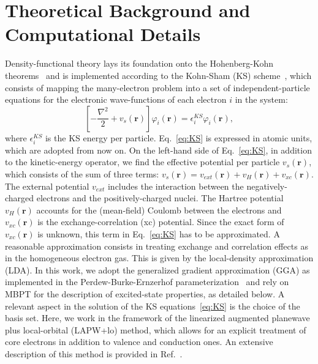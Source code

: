 \documentclass[aps,pra,superscriptaddress,twocolumn]{revtex4}
\begin{document}
\section{Theoretical Background and Computational Details}
\label{section:theory}

Density-functional theory lays its foundation onto the Hohenberg-Kohn theorems~\cite{hohe-kohn64pr} and is implemented according to the Kohn-Sham (KS) scheme~\cite{kohn-sham65pr}, which consists of mapping the many-electron problem into a set of independent-particle equations for the electronic wave-functions of each electron $i$ in the system:
%
\begin{equation}
\left[-\dfrac{\nabla^2}{2} + v_s(\mathbf{r}) \right] \varphi_i(\mathbf{r}) = \epsilon^{KS}_i \varphi_i(\mathbf{r}),
\label{eq:KS}
\end{equation}
%
where $\epsilon^{KS}_i$ is the KS energy per particle.
Eq.~\eqref{eq:KS} is expressed in atomic units, which are adopted from now on.
On the left-hand side of Eq.~\eqref{eq:KS}, in addition to the kinetic-energy operator, we find the effective potential per particle $v_s(\mathbf{r})$, which consists of the sum of three terms: $v_s(\mathbf{r}) = v_{ext}(\mathbf{r}) + v_H(\mathbf{r}) + v_{xc}(\mathbf{r})$. 
The external potential $v_{ext}$ includes the interaction between the negatively-charged electrons and the positively-charged nuclei.
The Hartree potential $v_H(\mathbf{r})$ accounts for the (mean-field) Coulomb between the electrons and $v_{xc}(\mathbf{r})$ is the exchange-correlation (xc) potential.
Since the exact form of $v_{xc}(\mathbf{r})$ is unknown, this term in Eq.~\eqref{eq:KS} has to be approximated. 
A reasonable approximation consists in treating exchange and correlation effects as in the homogeneous electron gas.
This is given by the local-density approximation (LDA).
In this work, we adopt the generalized gradient approximation (GGA) as implemented in the Perdew-Burke-Ernzerhof parameterization~\cite{pbe} and rely on MBPT for the description of excited-state properties, as detailed below.
A relevant aspect in the solution of the KS equations~\eqref{eq:KS} is the choice of the basis set.
Here, we work in the framework of the linearized augmented planewave plus local-orbital (LAPW+lo) method, which allows for an explicit treatment of core electrons in addition to valence and conduction ones.
An extensive description of this method is provided in Ref.~\cite{gula+14jpcm}.
\end{document}
